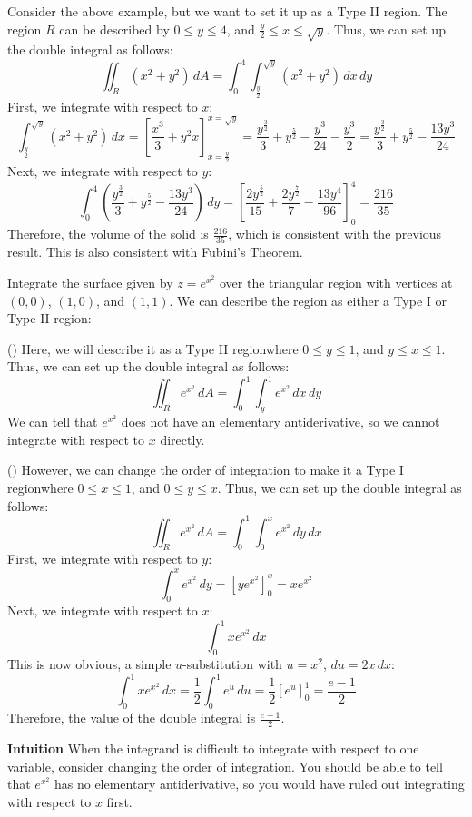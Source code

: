 \documentclass[11pt]{report}
\begin{document}
\begin{example}
    Consider the above example, but we want to set it up as a Type II region. The region $R$ can be described by $0 \le y \le 4$, and $\frac{y}{2} \le x \le \sqrt{y}$. Thus, we can set up the double integral as follows:
    $$
        \iint_R (x^2 + y^2) \, dA = \int_0^4 \int_{\frac{y}{2}}^{\sqrt{y}} (x^2 + y^2) \, dx \, dy
    $$
    First, we integrate with respect to $x$:
    $$
        \int_{\frac{y}{2}}^{\sqrt{y}} (x^2 + y^2) \, dx = \left[ \frac{x^3}{3} + y^2x \right]_{x=\frac{y}{2}}^{x=\sqrt{y}} = \frac{y^{\frac{3}{2}}}{3
        } + y^{\frac{5}{2}} - \frac{y^3}{24} - \frac{y^3}{2} = \frac{y^{\frac{3}{2}}}{3} + y^{\frac{5}{2}} - \frac{13y^3}{24}
    $$
    Next, we integrate with respect to $y$:
    $$
        \int_0^4 \left( \frac{y^{\frac{3}{2}}}{3} + y^{\frac{5}{2}} - \frac{13y^3}{24} \right) \, dy = \left[ \frac{2y^{\frac{5}{2}}}{15} + \frac{2y^{\frac{7}{2}}}{7} - \frac{13y^4}{96} \right]_0^4 = \frac{216}{35}
    $$
    Therefore, the volume of the solid is $\frac{216}{35}$, which is consistent with the previous result. This is also consistent with Fubini's Theorem.
\end{example}

\begin{example}
    Integrate the surface given by $z = e^{x^2}$ over the triangular region with vertices at $(0,0)$, $(1,0)$, and $(1,1)$. We can describe the region as either a Type I or Type II region:

    (\xmark) Here, we will describe it as a Type II regionwhere $0 \le y \le 1$, and $y \le x \le 1$. Thus, we can set up the double integral as follows:
    $$
        \iint_R e^{x^2} \, dA = \int_0^1 \int_y^1 e^{x^2} \, dx \, dy
    $$
    We can tell that $e^{x^2}$ does not have an elementary antiderivative, so we cannot integrate with respect to $x$ directly. 
    
    (\cmark) However, we can change the order of integration to make it a Type I regionwhere $0 \le x \le 1$, and $0 \le y \le x$. Thus, we can set up the double integral as follows:
    $$
        \iint_R e^{x^2} \, dA = \int_0^1 \int_0^x e^{x^2} \, dy \, dx
    $$
    First, we integrate with respect to $y$:
    $$
        \int_0^x e^{x^2} \, dy = \left[ y e^{x^2} \right]_0^x = xe^{x^2}
    $$
    Next, we integrate with respect to $x$:
    $$
        \int_0^1 xe^{x^2} \, dx
    $$
    This is now obvious, a simple $u$-substitution with $u = x^2$, $du = 2x \, dx$:
    $$
        \int_0^1 xe^{x^2} \, dx = \frac{1}{2} \int_0^1 e^u \, du = \frac{1}{2} \left[ e^u \right]_0^1 = \frac{e - 1}{2}
    $$
    Therefore, the value of the double integral is $\frac{e - 1}{2}$. 

    \textbf{Intuition} When the integrand is difficult to integrate with respect to one variable, consider changing the order of integration. You should be able to tell that $e^{x^2}$ has no elementary antiderivative, so you would have ruled out integrating with respect to $x$ first.
\end{example}
\end{document}

